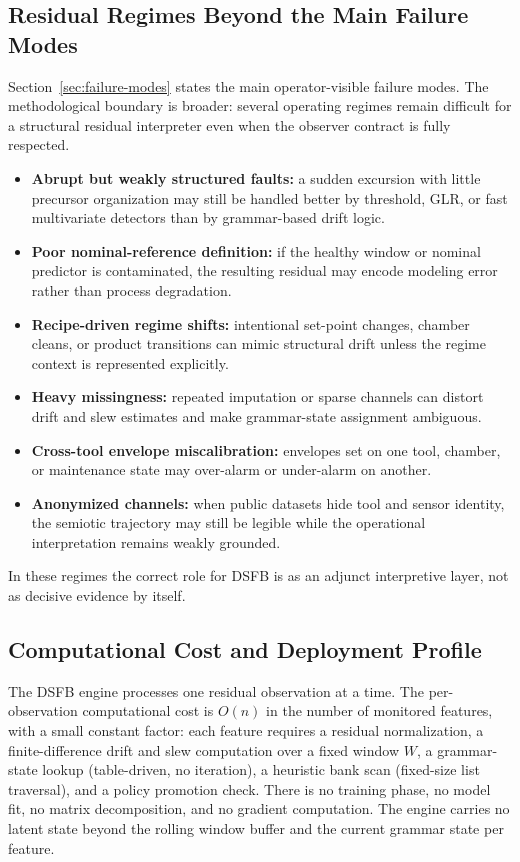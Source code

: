 \documentclass[11pt,letterpaper]{article}
\theoremstyle{scresult}
\begin{document}
\subsection{Residual Regimes Beyond the Main Failure Modes}

Section~\ref{sec:failure-modes} states the main operator-visible failure modes.
The methodological boundary is broader: several operating regimes remain
difficult for a structural residual interpreter even when the observer contract
is fully respected.
\begin{itemize}
  \item \textbf{Abrupt but weakly structured faults:} a sudden excursion with
        little precursor organization may still be handled better by threshold,
        GLR, or fast multivariate detectors than by grammar-based drift logic.
  \item \textbf{Poor nominal-reference definition:} if the healthy window or
        nominal predictor is contaminated, the resulting residual may encode
        modeling error rather than process degradation.
  \item \textbf{Recipe-driven regime shifts:} intentional set-point changes,
        chamber cleans, or product transitions can mimic structural drift unless
        the regime context is represented explicitly.
  \item \textbf{Heavy missingness:} repeated imputation or sparse channels can
        distort drift and slew estimates and make grammar-state assignment
        ambiguous.
  \item \textbf{Cross-tool envelope miscalibration:} envelopes set on one tool,
        chamber, or maintenance state may over-alarm or under-alarm on another.
  \item \textbf{Anonymized channels:} when public datasets hide tool and sensor
        identity, the semiotic trajectory may still be legible while the
        operational interpretation remains weakly grounded.
\end{itemize}

In these regimes the correct role for DSFB is as an adjunct interpretive layer,
not as decisive evidence by itself.

\subsection{Computational Cost and Deployment Profile}
\label{sec:compute-cost}

The DSFB engine processes one residual observation at a time. The per-observation
computational cost is $O(n)$ in the number of monitored features, with a small
constant factor: each feature requires a residual normalization, a
finite-difference drift and slew computation over a fixed window $W$, a grammar-state
lookup (table-driven, no iteration), a heuristic bank scan (fixed-size list
traversal), and a policy promotion check. There is no training phase, no model
fit, no matrix decomposition, and no gradient computation. The engine carries no
latent state beyond the rolling window buffer and the current grammar state per
feature.
\end{document}
